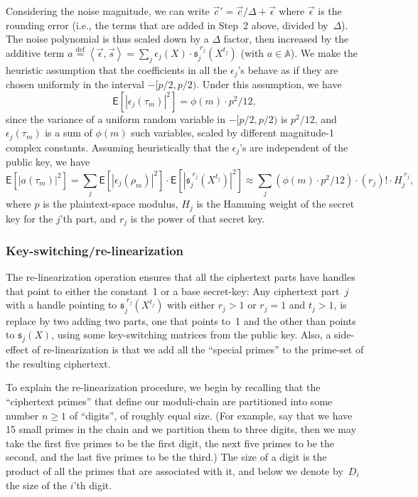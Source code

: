 \documentclass[14pt]{extarticle}
\newcommand{\A}{\mathbb{A}}
\newcommand{\grp}[1]{\left\langle #1 \right\rangle}
\def\eqdef{\stackrel{\mathrm{def}}{=}}
\def\EXP{\mathsf{E}}
\def\vc{\vec{c}}
\def\vs{\vec{s}}
\newcommand{\sk}{\mathfrak{s}}
\begin{document}
Considering the noise magnitude, we can write $\vc'=\vc/\Delta+
\vec{\epsilon}$ where $\vec{\epsilon}$ is the rounding error (i.e.,
the terms that are added in Step~2 above, divided by~$\Delta$).
The noise polynomial is thus scaled down by a $\Delta$ factor, then
increased by the additive term $a\eqdef\grp{\vec{\epsilon},\vs}=
\sum_j \epsilon_j(X)\cdot\sk_j^{\;r_j}(X^{t_j})$ (with $a\in\A$).
We make the heuristic assumption that the coefficients in all the
$\epsilon_j$'s behave as if they are chosen uniformly in the interval
$-[p/2,p/2)$. Under this assumption, we have 
\[
\EXP\left[\left|\epsilon_j(\tau_m)\right|^2\right] = \phi(m)\cdot p^2/12,
\]
since the variance of a uniform random variable in $-[p/2,p/2)$ is
$p^2/12$, and $\epsilon_j(\tau_m)$ is a sum of $\phi(m)$ such
variables, scaled by different magnitude-1 complex constants. Assuming
heuristically that the $\epsilon_j$'s are independent of the public
key, we have
\[
\EXP\left[\left|a(\tau_m)\right|^2\right] 
= \sum_j \EXP\left[\left|\epsilon_j(\rho_m)\right|^2\right]
         \cdot\EXP\left[\left|\sk_j^{\;r_j}(X^{t_j})\right|^2\right]
\approx \sum_j (\phi(m)\cdot p^2/12) \cdot (r_j)! \cdot  H_j^{\;r_j},
\]
where $p$ is the plaintext-space modulus, $H_j$ is the Hamming weight
of the secret key for the $j$'th part, and $r_j$ is the power of that
secret key.

\subsubsection{Key-switching/re-linearization}\label{sec:keySwitching}
The re-linearization operation ensures that all the ciphertext parts
have handles that point to either the constant~1 or a base secret-key:
Any ciphertext part~$j$ with a handle pointing to $\sk_j^{\;r_j}(
X^{t_j})$ with either $r_j>1$ or $r_j=1$ and $t_j>1$, is replace by
two adding two parts, one that points to~1 and the other than points
to $\sk_j(X)$, using some key-switching matrices from the public key.
Also, a side-effect of re-linearization is that we add all the
``special primes'' to the prime-set of the resulting ciphertext.

To explain the re-linearization procedure, we begin by recalling that
the ``ciphertext primes'' that define our moduli-chain are partitioned
into some number $n\ge 1$ of ``digits'', of roughly equal size.
(For example, say that we have 15 small primes in the chain and we
partition them to three digits, then we may take the first five primes
to be the first digit, the next five primes to be the second, and the
last five primes to be the third.) The size of a digit is the product
of all the primes that are associated with it, and below we denote
by~$D_i$ the size of the $i$'th digit.
\end{document}
